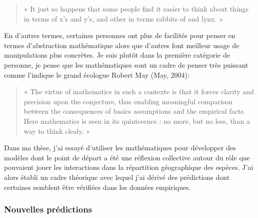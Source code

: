 \begin{quote}
« It just so happens that some people find it easier to think about
things in terms of x's and y's, and other in terms rabbits of and lynx.
»
\end{quote}

En d'autres termes, certaines personnes ont plus de facilités pour
penser en termes d'abstraction mathématique alors que d'autres font
meilleur usage de manipulations plus concrètes. Je suis plutôt dans la
première catégorie de personne, je pense que les mathématiques sont un
cadre de penser très puissant comme l'indique le grand écologue Robert
May (May, 2004):

\begin{quote}
« The virtue of mathematics in such a contexte is that it forces clarity
and precision upon the conjecture, thus enabling meaningful comparison
between the consequences of basics assumptions and the empirical facts.
Here mathematics is seen in its quintesence : no more, but no less, than
a way to think clealy. »
\end{quote}

Dans ma thèse, j'ai essayé d'utiliser les mathématiques pour développer
des modèles dont le point de départ a été une réflexion collective
autour du rôle que pouvaient jouer les interactions dans la répartition
géographique des espèces. J'ai alors établi un cadre théorique avec
lequel j'ai dérivé des prédictions dont certaines semblent être
vérifiées dans les données empiriques.

\subsubsection*{Nouvelles prédictions}\label{nouvelles-pruxe9dictions}

